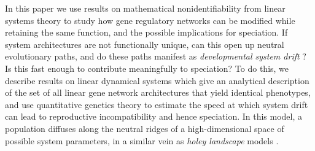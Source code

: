 \documentclass{article}
\newcommand{\1}{\mathbbm{1}}
\begin{document}
In this paper we use results on mathematical nonidentifiability from
linear systems theory to study how gene regulatory networks can be modified
while retaining the same function, and the possible implications for speciation.
If system architectures are not functionally unique,
can this open up neutral evolutionary paths,
and do these paths manifest as \emph{developmental system drift} \citep{true2001developmental}?
Is this fast enough to contribute meaningfully to speciation?
To do this, we describe results on linear dynamical systems which give
an analytical description of the set of 
all linear gene network architectures that yield identical phenotypes,
and use quantitative genetics theory to estimate the speed at which system drift can lead to reproductive incompatibility and hence speciation.
In this model,
a population diffuses along the neutral ridges of a high-dimensional space of possible system parameters,
in a similar vein as \emph{holey landscape} models \citep{gavrilets1997evolution, yamaguchi2013first, pina2019does}.
\end{document}
